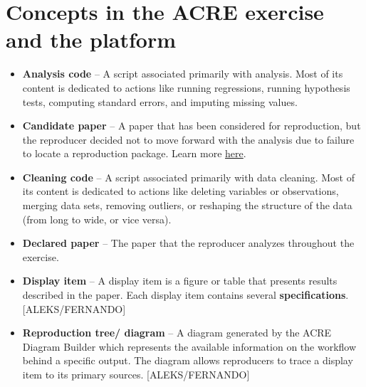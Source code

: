 \documentclass[]{book}
\providecommand{\tightlist}{%
  \setlength{\itemsep}{0pt}\setlength{\parskip}{0pt}}
\begin{document}
\hypertarget{concepts-in-the-acre-exercise-and-the-platform}{%
\section{Concepts in the ACRE exercise and the platform}\label{concepts-in-the-acre-exercise-and-the-platform}}

\begin{itemize}
\tightlist
\item
  \textbf{Analysis code} -- A script associated primarily with analysis. Most of its content is dedicated to actions like running regressions, running hypothesis tests, computing standard errors, and imputing missing values.\\
\item
  \textbf{Candidate paper} -- A paper that has been considered for reproduction, but the reproducer decided not to move forward with the analysis due to failure to locate a reproduction package. Learn more \href{https://bitss.github.io/ACRE/scoping.html\#from-candidate-to-declared-paper}{here}.
\item
  \textbf{Cleaning code} -- A script associated primarily with data cleaning. Most of its content is dedicated to actions like deleting variables or observations, merging data sets, removing outliers, or reshaping the structure of the data (from long to wide, or vice versa).\\
\item
  \textbf{Declared paper} -- The paper that the reproducer analyzes throughout the exercise.
\item
  \textbf{Display item} -- A display item is a figure or table that presents results described in the paper. Each display item contains several \textbf{specifications}. {[}ALEKS/FERNANDO{]}\\
\item
  \textbf{Reproduction tree/ diagram} -- A diagram generated by the ACRE Diagram Builder which represents the available information on the workflow behind a specific output. The diagram allows reproducers to trace a display item to its primary sources. {[}ALEKS/FERNANDO{]}
\end{itemize}


\end{document}

